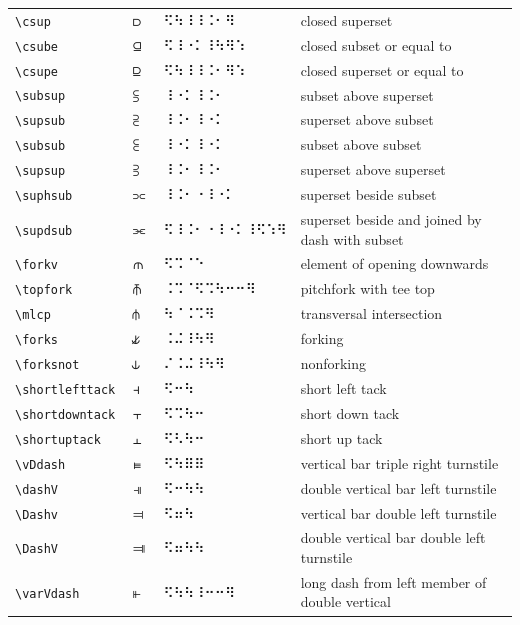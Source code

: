 \documentclass[oneside]{article}
\begin{document}
\begin{longtable}{llll}
\verb|\csup| & $\csup$ &   ⠫⠳⠸⠸⠨⠂⠻   & {closed superset} \\[2ex]
\verb|\csube| & $\csube$ &   ⠫⠸⠐⠅⠸⠳⠻⠱   & {closed subset or equal to} \\[2ex]
\verb|\csupe| & $\csupe$ &   ⠫⠳⠸⠸⠨⠂⠻⠱   & {closed superset or equal to} \\[2ex]
\verb|\subsup| & $\subsup$ &   ⠸⠐⠅⠸⠨⠂   & {subset above superset} \\[2ex]
\verb|\supsub| & $\supsub$ &   ⠸⠨⠂⠸⠐⠅   & {superset above subset} \\[2ex]
\verb|\subsub| & $\subsub$ &   ⠸⠐⠅⠸⠐⠅   & {subset above subset} \\[2ex]
\verb|\supsup| & $\supsup$ &   ⠸⠨⠂⠸⠨⠂   & {superset above superset} \\[2ex]
\verb|\suphsub| & $\suphsub$ &   ⠸⠨⠂⠐⠸⠐⠅   & {superset beside subset} \\[2ex]
\verb|\supdsub| & $\supdsub$ &   ⠫⠸⠨⠂⠐⠸⠐⠅⠸⠫⠱⠻   & {superset beside and joined by dash with subset} \\[2ex]
\verb|\forkv| & $\forkv$ &   ⠫⠩⠈⠑   & {element of opening downwards} \\[2ex]
\verb|\topfork| & $\topfork$ &   ⠨⠩⠈⠫⠩⠳⠒⠒⠻   & {pitchfork with tee top} \\[2ex]
\verb|\mlcp| & $\mlcp$ &   ⠳⠈⠨⠩⠻   & {transversal intersection} \\[2ex]
\verb|\forks| & $\forks$ &   ⠨⠬⠸⠳⠻   & {forking} \\[2ex]
\verb|\forksnot| & $\forksnot$ &   ⠌⠨⠬⠸⠳⠻   & {nonforking} \\[2ex]
\verb|\shortlefttack| & $\shortlefttack$ &   ⠫⠒⠳   & {short left tack} \\[2ex]
\verb|\shortdowntack| & $\shortdowntack$ &   ⠫⠩⠳⠒   & {short down tack} \\[2ex]
\verb|\shortuptack| & $\shortuptack$ &   ⠫⠣⠳⠒   & {short up tack} \\[2ex]
\verb|\vDdash| & $\vDdash$ &   ⠫⠳⠿⠿   & {vertical bar triple right turnstile} \\[2ex]
\verb|\dashV| & $\dashV$ &   ⠫⠒⠳⠳   & {double vertical bar left turnstile} \\[2ex]
\verb|\Dashv| & $\Dashv$ &   ⠫⠶⠳   & {vertical bar double left turnstile} \\[2ex]
\verb|\DashV| & $\DashV$ &   ⠫⠶⠳⠳   & {double vertical bar double left turnstile} \\[2ex]
\verb|\varVdash| & $\varVdash$ &   ⠫⠳⠳⠸⠒⠒⠻   & {long dash from left member of double vertical} \\[2ex]

\end{longtable}
\end{document}
